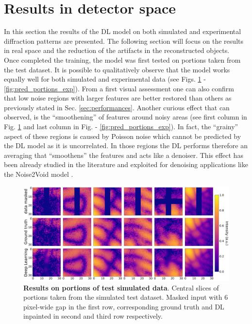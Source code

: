\section{Results in detector space}\label{sec:res_rec}

In this section the results of the DL model on both simulated and experimental diffraction patterns are presented. 
The following section will focus on the results in real space and the reduction of the artifacts 
in the reconstructed objects.\\

Once completed the training, the model was first tested on portions taken from the test dataset. It is possible
to qualitatively observe that the model works equally well for both simulated and experimental data (see Figs. \ref{fig:pred_portions_sim}
- \ref{fig:pred_portions_exp}). From a first visual assessment one can also confirm that low noise regions with larger features
are better restored than others as previously stated in Sec. \ref{sec:performances}. Another curious effect that can observed, 
is the ``smoothening'' of features around noisy areas (see first column in Fig. \ref{fig:pred_portions_sim} and last column in Fig.
- \ref{fig:pred_portions_exp}). In fact, the ``grainy'' aspect of these regions is caused by Poisson noise which cannot
be predicted by the DL model as it is uncorrelated. In those regions the DL performs therefore an averaging that 
``smoothens'' the features and acts like a denoiser. This effect has been already studied in the literature and exploited 
for denoising applications like the Noise2Void model \cite{Noise2Void}.

\begin{figure}[H]
    \centering
    \includegraphics[width=\textwidth]{figures/Inpainting/prediction_small_simulated.pdf}
    \caption{\textbf{Results on portions of test simulated data}. Central slices of portions taken from the simulated test
    dataset. Masked input with 6 pixel-wide gap in the first row, corresponding ground truth and DL inpainted in second and third
    row respectively.}
    \label{fig:pred_portions_sim}
\end{figure}

